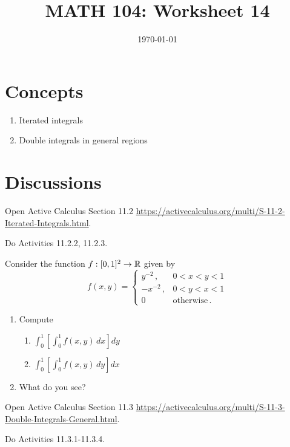 \documentclass[12pt]{amsart}
\title{ MATH 104: Worksheet 14}
\author{}
\date{\today}
\begin{document}
\maketitle

\section{Concepts}

\begin{enumerate}
    \item Iterated integrals
    \item Double integrals in general regions
\end{enumerate}

\section{Discussions}

\begin{problem}
    Open Active Calculus Section 11.2 \url{https://activecalculus.org/multi/S-11-2-Iterated-Integrals.html}.

    Do Activities 11.2.2, 11.2.3.
\end{problem}

\begin{problem}
    Consider the function $f: [0,1]^2 \to \mathbb{R}$ given by
    \begin{equation*}
        f(x,y) = 
        \begin{cases}
            y^{-2} \,, & 0 < x < y <1 \\
            -x^{-2} \,, & 0 < y < x <1 \\
            0 & \mathrm{otherwise} \,.
        \end{cases}
    \end{equation*}

    \begin{enumerate}
        \item Compute
            \begin{enumerate}
                \item $\int_0^1 \left[  \int_0^1 f(x,y) \, dx \right]  dy$
                \item $\int_0^1 \left[  \int_0^1 f(x,y) \, dy \right]  dx$
            \end{enumerate}
        \item What do you see?
    \end{enumerate}
\end{problem}

\begin{problem}
    Open Active Calculus Section 11.3 \url{https://activecalculus.org/multi/S-11-3-Double-Integrals-General.html}.

    Do Activities 11.3.1-11.3.4.
\end{problem}
\end{document}
